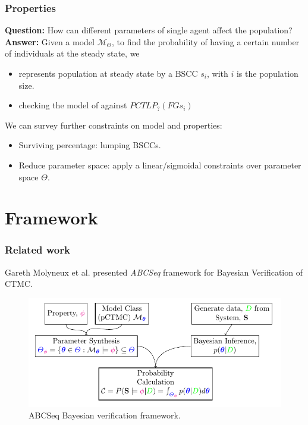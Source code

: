 \documentclass{beamer}
\begin{document}
\begin{frame}
  \frametitle{Properties}
  \textbf{Question:} How can different parameters of single agent affect the
  population?\\
  \textbf{Answer:}
  Given a model $\mathcal{M}_\Theta$, to find the probability of having a
  certain number of individuals at the steady state, we
  \begin{itemize}
  \item represents population at steady state by a BSCC $s_i$, with $i$ is the
    population size.
  \item checking the model of against $PCTL P_{?} (FG s_i)$
  \end{itemize}

  We can survey further constraints on model and properties:
  \begin{itemize}
  \item Surviving percentage: lumping BSCCs.
  \item Reduce parameter space: apply a linear/sigmoidal constraints over
    parameter space $\Theta$.
  \end{itemize}
  
\end{frame}


\section{Framework}
\begin{frame}
  \frametitle{Related work}
  Gareth Molyneux et al. \cite{molyneux2019bayesian} presented \textit{ABCSeq} framework
  for Bayesian Verification of CTMC.
  \begin{figure}[t]
    \includegraphics[height=0.7\textheight]{molyneux2019.png} \centering
    \caption{ABCSeq Bayesian verification framework.}
  \end{figure}
\end{frame}
\end{document}

